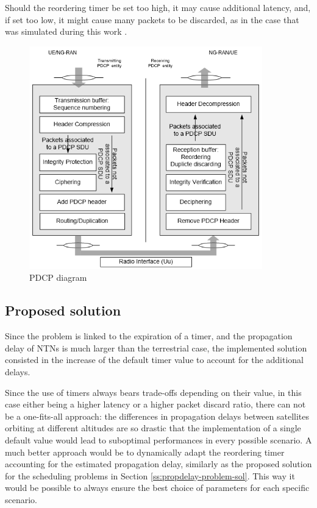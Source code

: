 Should the reordering timer be set too high, it may cause additional latency, and, if set too low, it might cause many packets to be discarded, as in the case that was simulated during this work \cite{efficient-reassembly-pdcp}.

\begin{figure}[ht]
    \centering
    \includegraphics[width=0.9\textwidth]{res/pdcp-functionality.png}
    \caption{PDCP diagram \cite{pdcp-spec-3gpp}}
    \label{fig:pdcp-functionalities}
\end{figure}

\subsection{Proposed solution}
Since the problem is linked to the expiration of a timer, and the propagation delay of \ac{NTNs} is much larger than the terrestrial case, the implemented solution consisted in the increase of the default timer value to account for the additional delays.

Since the use of timers always bears trade-offs depending on their value, in this case either being a higher latency or a higher packet discard ratio, there can not be a one-fits-all approach: the differences in propagation delays between satellites orbiting at different altitudes are so drastic that the implementation of a single default value would lead to suboptimal performances in every possible scenario. A much better approach would be to dynamically adapt the reordering timer accounting for the estimated propagation delay, similarly as the proposed solution for the scheduling problems in Section \ref{ss:propdelay-problem-sol}. This way it would be possible to always ensure the best choice of parameters for each specific scenario.
